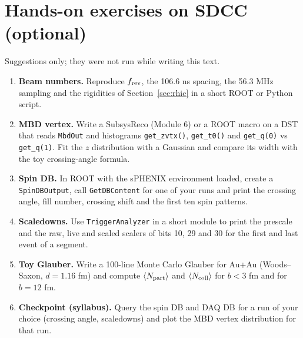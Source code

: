 \documentclass[11pt,letterpaper]{article}
\begin{document}
\section{Hands-on exercises on SDCC (optional)}\label{sec:handson}
Suggestions only; they were not run while writing this text.
\begin{enumerate}
\item \textbf{Beam numbers.} Reproduce $f_{\rm rev}$, the 106.6 ns spacing, the 56.3 MHz sampling and the rigidities of
Section~\ref{sec:rhic} in a short ROOT or Python script.
\item \textbf{MBD vertex.} Write a SubsysReco (Module 6) or a ROOT macro on a DST that reads \texttt{MbdOut} and histograms
\texttt{get\_zvtx()}, \texttt{get\_t0()} and \texttt{get\_q(0)} vs \texttt{get\_q(1)}. Fit the $z$ distribution with a Gaussian
and compare its width with the toy crossing-angle formula.
\item \textbf{Spin DB.} In ROOT with the sPHENIX environment loaded, create a \texttt{SpinDBOutput}, call
\texttt{GetDBContent} for one of your runs and print the crossing angle, fill number, crossing shift and the first ten spin patterns.
\item \textbf{Scaledowns.} Use \texttt{TriggerAnalyzer} in a short module to print the prescale and the raw, live and scaled
scalers of bits 10, 29 and 30 for the first and last event of a segment.
\item \textbf{Toy Glauber.} Write a 100-line Monte Carlo Glauber for Au+Au (Woods--Saxon, $d=1.16$ fm) and compute
$\langle N_{\rm part}\rangle$ and $\langle N_{\rm coll}\rangle$ for $b<3$ fm and for $b=12$ fm.
\item \textbf{Checkpoint (syllabus).} Query the spin DB and DAQ DB for a run of your choice (crossing angle, scaledowns) and plot
the MBD vertex distribution for that run.
\end{enumerate}
\end{document}
